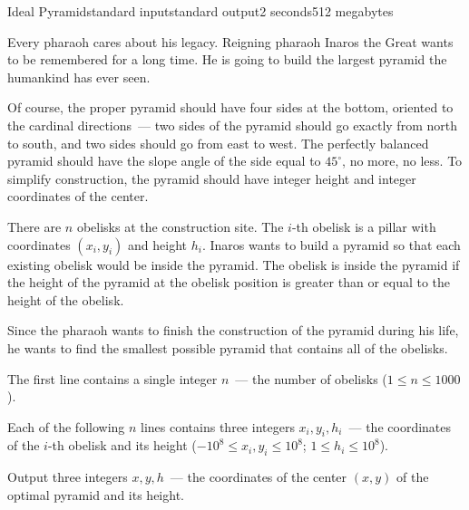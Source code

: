 \begin{problem}{Ideal Pyramid}{standard input}{standard output}{2 seconds}{512 megabytes}

Every pharaoh cares about his legacy. Reigning pharaoh Inaros the Great wants to be remembered for a long time. He is going to build the largest pyramid the humankind has ever seen. 

Of course, the proper pyramid should have four sides at the bottom, oriented to the cardinal directions~--- two sides of the pyramid should go exactly from north to south, and two sides should go from east to west. The perfectly balanced pyramid should have the slope angle of the side equal to $45^{\circ}$, no more, no less. To simplify construction, the pyramid should have integer height and integer coordinates of the center.

There are $n$ obelisks at the construction site. The $i$-th obelisk is a pillar with coordinates $(x_i, y_i)$ and height $h_i$. Inaros wants to build a pyramid so that each existing obelisk would be inside the pyramid. The obelisk is inside the pyramid if the height of the pyramid at the obelisk position is greater than or equal to the height of the obelisk.

Since the pharaoh wants to finish the construction of the pyramid during his life, he wants to find the smallest possible pyramid that contains all of the obelisks.


\InputFile
The first line contains a single integer $n$~--- the number of obelisks ($1 \le n \le 1000$).

Each of the following $n$ lines contains three integers $x_i, y_i, h_i$~--- the coordinates of the $i$-th obelisk and its height ($-10^8 \le x_i, y_i \le 10^8$; $1 \le h_i \le 10^8$).


\OutputFile
Output three integers $x, y, h$~--- the coordinates of the center $(x, y)$ of the optimal pyramid and its height.

\Examples

\begin{example}
%
%
\end{example}

\end{problem}

